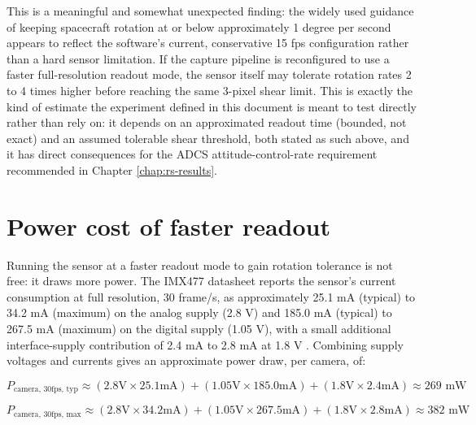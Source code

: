This is a meaningful and somewhat unexpected finding: the widely used guidance of keeping spacecraft rotation at or below approximately 1 degree per second appears to reflect the software's current, conservative 15 fps configuration rather than a hard sensor limitation. If the capture pipeline is reconfigured to use a faster full-resolution readout mode, the sensor itself may tolerate rotation rates 2 to 4 times higher before reaching the same 3-pixel shear limit. This is exactly the kind of estimate the experiment defined in this document is meant to test directly rather than rely on: it depends on an approximated readout time (bounded, not exact) and an assumed tolerable shear threshold, both stated as such above, and it has direct consequences for the ADCS attitude-control-rate requirement recommended in Chapter \ref{chap:rs-results}.

\section{Power cost of faster readout}
\label{sec:power-cost}

Running the sensor at a faster readout mode to gain rotation tolerance is not free: it draws more power. The IMX477 datasheet reports the sensor's current consumption at full resolution, 30 frame/s, as approximately 25.1 mA (typical) to 34.2 mA (maximum) on the analog supply (2.8 V) and 185.0 mA (typical) to 267.5 mA (maximum) on the digital supply (1.05 V), with a small additional interface-supply contribution of 2.4 mA to 2.8 mA at 1.8 V \cite{sony_imx477_datasheet}. Combining supply voltages and currents gives an approximate power draw, per camera, of:

\begin{equation}
P_{\text{camera, 30fps, typ}} \approx (2.8\text{V} \times 25.1\text{mA}) + (1.05\text{V} \times 185.0\text{mA}) + (1.8\text{V} \times 2.4\text{mA}) \approx 269\text{ mW}
\end{equation}

\begin{equation}
P_{\text{camera, 30fps, max}} \approx (2.8\text{V} \times 34.2\text{mA}) + (1.05\text{V} \times 267.5\text{mA}) + (1.8\text{V} \times 2.8\text{mA}) \approx 382\text{ mW}
\end{equation}

